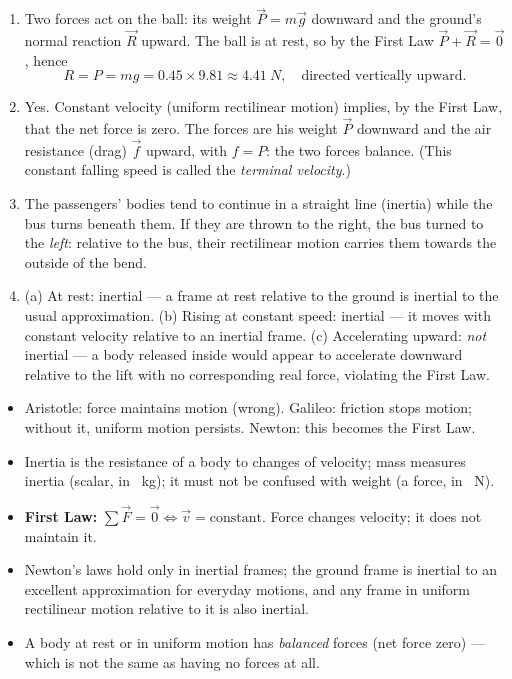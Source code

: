 \documentclass[11pt]{article}
\newcommand{\cle}[1]{{\popxbold\color{popdark}#1}}
\begin{document}
\begin{corrige}[Exercise 1]
\begin{enumerate}
\item Two forces act on the ball: its weight $\vec{P}=m\vec{g}$ downward and the ground's normal reaction $\vec{R}$ upward. The ball is at rest, so by the First Law $\vec{P}+\vec{R}=\vec{0}$, hence
\[
R = P = mg = 0.45 \times 9.81 \approx \SI{4.41}{N}, \quad \text{directed vertically upward.}
\]
\item Yes. Constant velocity (uniform rectilinear motion) implies, by the First Law, that the net force is zero. The forces are his weight $\vec{P}$ downward and the air resistance (drag) $\vec{f}$ upward, with $f = P$: the two forces balance. (This constant falling speed is called the \emph{terminal velocity}.)
\item The passengers' bodies tend to continue in a straight line (inertia) while the bus turns beneath them. If they are thrown to the right, the bus turned to the \emph{left}: relative to the bus, their rectilinear motion carries them towards the outside of the bend.
\item (a) At rest: inertial — a frame at rest relative to the ground is inertial to the usual approximation. (b) Rising at constant speed: inertial — it moves with constant velocity relative to an inertial frame. (c) Accelerating upward: \emph{not} inertial — a body released inside would appear to accelerate downward relative to the lift with no corresponding real force, violating the First Law.
\end{enumerate}
\end{corrige}

\begin{aretenir}
\begin{itemize}
\item Aristotle: force maintains motion (wrong). Galileo: friction stops motion; without it, uniform motion persists. Newton: this becomes the First Law.
\item \cle{Inertia} is the resistance of a body to changes of velocity; \cle{mass} measures inertia (scalar, in \SI{}{kg}); it must not be confused with weight (a force, in \SI{}{N}).
\item \textbf{First Law:} $\sum \vec{F}=\vec{0} \iff \vec{v}=\text{constant}$. Force changes velocity; it does not maintain it.
\item Newton's laws hold only in \cle{inertial frames}; the ground frame is inertial to an excellent approximation for everyday motions, and any frame in uniform rectilinear motion relative to it is also inertial.
\item A body at rest or in uniform motion has \emph{balanced} forces (net force zero) — which is not the same as having no forces at all.
\end{itemize}
\end{aretenir}
\end{document}
